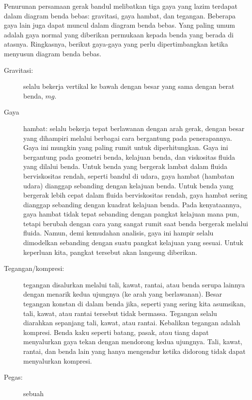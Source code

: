 Penurunan persamaan gerak bandul melibatkan tiga gaya yang lazim terdapat
dalam diagram benda bebas: gravitasi, gaya hambat, dan tegangan. Beberapa
gaya lain juga dapat muncul dalam diagram benda bebas. Yang paling
umum adalah gaya normal yang diberikan permukaan kepada benda yang
berada di atasnya. Ringkasnya, berikut gaya-gaya yang perlu dipertimbangkan
ketika menyusun diagram benda bebas. 
\begin{description}
\item [{Gravitasi:}] selalu
bekerja vertikal ke bawah dengan besar yang sama dengan berat benda,
$mg$. 
\item [{Gaya}] hambat: selalu
bekerja tepat berlawanan dengan arah gerak, dengan besar yang dihampiri
melalui berbagai cara bergantung pada penerapannya. Gaya ini mungkin
yang paling rumit untuk diperhitungkan. Gaya ini bergantung pada geometri
benda, kelajuan benda, dan viskositas fluida yang dilalui benda. Untuk
benda yang bergerak lambat dalam fluida berviskositas rendah, seperti
bandul di udara, gaya hambat (hambatan udara) dianggap sebanding dengan
kelajuan benda. Untuk benda yang bergerak lebih cepat dalam fluida
berviskositas rendah, gaya hambat sering dianggap sebanding dengan
kuadrat kelajuan benda. Pada kenyataannya, gaya hambat tidak tepat
sebanding dengan pangkat kelajuan mana pun, tetapi berubah dengan
cara yang sangat rumit saat benda bergerak melalui fluida. Namun,
demi kemudahan analisis, gaya ini hampir selalu dimodelkan sebanding
dengan suatu pangkat kelajuan yang sesuai. Untuk keperluan kita, pangkat
tersebut akan langsung diberikan.
\item [{Tegangan/kompresi:}] tegangan
disalurkan melalui tali, kawat, rantai, atau benda serupa lainnya
dengan menarik kedua ujungnya (ke arah yang berlawanan). Besar tegangan
konstan di dalam benda jika, seperti yang sering kita asumsikan, tali,
kawat, atau rantai tersebut tidak bermassa. Tegangan selalu diarahkan
sepanjang tali, kawat, atau rantai. Kebalikan tegangan adalah kompresi.
Benda kaku seperti batang, pasak, atau tiang dapat menyalurkan gaya
tekan dengan mendorong kedua ujungnya. Tali, kawat, rantai, dan benda
lain yang hanya mengendur ketika didorong tidak dapat menyalurkan
kompresi.
\item [{Pegas:}] sebuah

\end{description}
